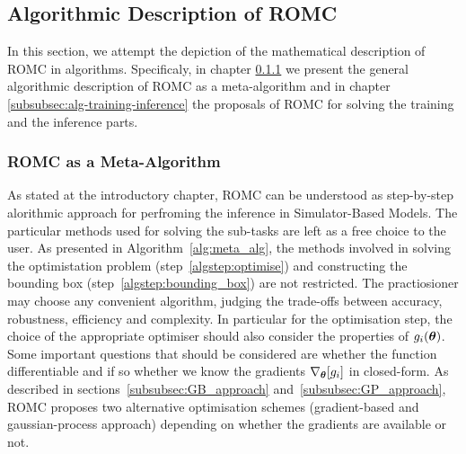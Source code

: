 \subsection{Algorithmic Description of ROMC}

In this section, we attempt the depiction of the mathematical
description of ROMC in algorithms. Specificaly, in chapter
\ref{subsubsec:romc-meta-algorithm} we present the general algorithmic
description of ROMC as a meta-algorithm and in chapter
\ref{subsubsec:alg-training-inference} the proposals of ROMC for
solving the training and the inference parts.

\subsubsection{ROMC as a Meta-Algorithm}
\label{subsubsec:romc-meta-algorithm}

As stated at the introductory chapter, ROMC can be understood as
step-by-step alorithmic approach for perfroming the inference in
Simulator-Based Models. The particular methods used for solving the
sub-tasks are left as a free choice to the user. As presented in
Algorithm~\ref{alg:meta_alg}, the methods involved in solving the
optimistation problem (step~\ref{algstep:optimise}) and constructing
the bounding box (step~\ref{algstep:bounding_box}) are not
restricted. The practiosioner may choose any convenient algorithm,
judging the trade-offs between accuracy, robustness, efficiency and
complexity. In particular for the optimisation step, the choice of the
appropriate optimiser should also consider the properties of
$g_i(\boldsymbol{\theta})$. Some important questions that should be considered are
whether the function differentiable and if so whether we know the
gradients $\nabla_{\boldsymbol{\theta}} [g_i] $ in closed-form. As described in
sections~\ref{subsubsec:GB_approach} and~\ref{subsubsec:GP_approach},
ROMC proposes two alternative optimisation schemes (gradient-based and
gaussian-process approach) depending on whether the gradients are
available or not.

